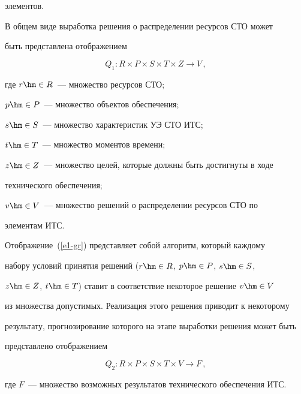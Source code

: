 элементов.


  


  В общем виде выработка решения о распределении ресурсов СТО может 


быть представлена отображением


  \begin{equation}


  Q_1: R\times P\times S\times T\times Z\rightarrow V\,,


  \label{e1-gr}


  \end{equation}


где $r\hm\in R$~--- множество ресурсов СТО;


  $p\hm\in P$~--- множество объектов обеспечения;


  $s\hm\in S$~--- множество характеристик УЭ СТО ИТС;


  $t\hm\in T$~--- множество моментов времени;


  $z\hm\in Z$~--- множество целей, которые должны быть достигнуты в ходе 


технического обеспечения;


  $v\hm\in V$~--- множество решений о распределении ресурсов СТО по 


элементам ИТС.


  





  Отображение~(\ref{e1-gr}) представляет собой алгоритм, который каждому 


набору условий принятия решений ($r\hm\in R$, $p\hm\in P$, $s\hm\in S$, 


$z\hm\in Z$, $t\hm\in T$) ставит в соответствие некоторое решение $v\hm\in V$ 


из множества допустимых. Реализация этого решения приводит к некоторому 


результату, прогнозирование которого на этапе выработки решения может быть 


представлено отображением


  \begin{equation}


Q_2: R \times P \times S \times T \times V\rightarrow F\,,


\label{e2-gr}


\end{equation}


где $F$~--- множество возможных результатов технического обеспечения ИТС.


